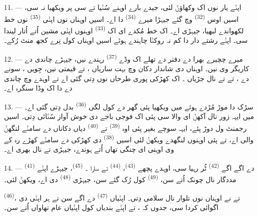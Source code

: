 \VUsaut{3.0mm}

11. --- اپݨے یار نوں اک  وکھاؤݨ لئی، جیدے بارے اوہنے سُݨیا تے سی
پر ویکھیا نہ سی، اسیں اوس  \textsuperscript{(32)} وچ گئے جیہڑا میرے
 \textsuperscript{(34)} دا اے۔ اسیں اوہناں نوں اپݨی 
\textsuperscript{(35)} نوں خط لکھواندے لبھیا، جیہڑی  اے۔ اک خط
مُکدے ای اک  \textsuperscript{(33)} اوہنوں اپݨی مشین اُتے اُتار لیندا سی۔
اپݨے رشتے دار دا کم نہ روکݨا چاہندے ہوئے اسیں اوہناں کول نِرے کجھ منٹ رُکے۔

12. --- میرے چچیرے بھرا دے دفتر دے تھلے اک وڈے 
\textsuperscript{(37)} رہندے نیں، جیہڑے چاندی دے کاریگر وی نیں۔ اوہناں دی شاندار
دکان وچ بہت ساریاں ،
 تے قیمتی  نیں، جِویں ، سونے دے
،  تے  تے  نال
جڑیاں ۔ اک کھڑکی پوری طرحاں  نوں دِتی گئی اے
تے اوہدے وچ چاندی دے  دا اک وڈا سنگرہ اے۔

13. --- سڑک دا موڑ مُڑدے ہوئے میں ویکھیا پئی گھر دے  کول لگی
 \textsuperscript{(36)} بدل دِتی گئی اے۔ میں ایہہ زور نال آکھݨ ای
والا سی پئی اک فوجی باجے دی خوش آواز سُݨائی دِتی۔ اسیں رجمنٹ ول دوڑ پئے، ایہہ سوچے
بغیر پئی اوہ  \textsuperscript{(39)} تے 
\textsuperscript{(40)} دیاں دکاناں دے سامݨے لنگھݨ والی اے، تے پئی اوہنوں لنگھدے ویکھݨ
لئی اسیں  \textsuperscript{(38)} دی کھڑکی دے سامݨے کھڑے رہ کے وی
اوہنی ای چنگی تھاں اُتے ہوندے، جیہڑی  تے
 نال بھری اے۔

\VUsaut{3.0mm}

14. ---  \textsuperscript{(41)} دے اگے اگے 
\textsuperscript{(42)} ٹُر رہیا سی، اوہدے پچھے  \textsuperscript{(43)}،
 \textsuperscript{(44)} تے سارا ۔ 
\textsuperscript{(45)}، جیہڑے اپݨے مددگار نال چونک اُتے سن، 
\textsuperscript{(49)} کول رُک گئے سن، جیہڑی  \textsuperscript{(48)} دی
اے،  ویکھݨ لئی۔

 \textsuperscript{(46)}،  تے 
نے اوہناں نوں تلوار نال سلامی دِتی۔  اپݨیاں 
\textsuperscript{(47)} دے اگے سن تے ہر  اپݨی  دی اگوائی
کردا سی، جدوں کہ ،  تے
 اپݨے بندیاں کول اپݨیاں عام تھاواں اُتے سن۔


